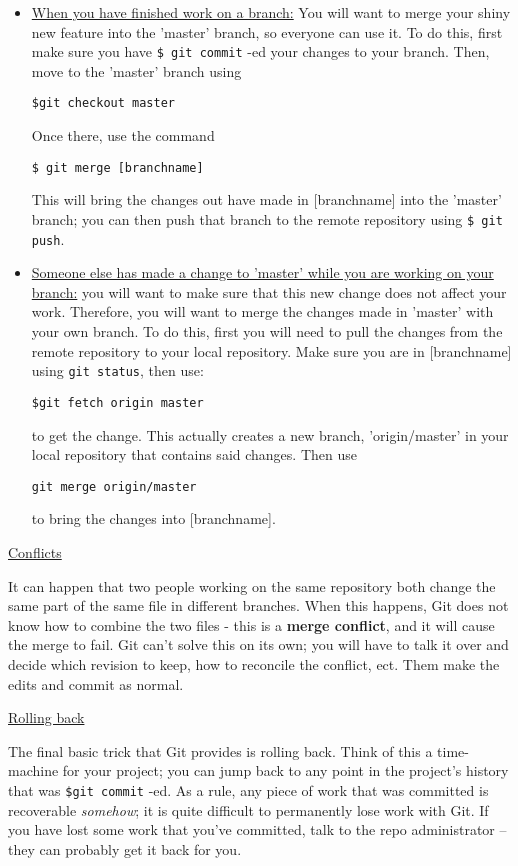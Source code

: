 \documentclass[11pt, a4paper, english]{article}
\begin{document}
\begin{itemize}
\item \underline{When you have finished work on a branch:} You will want to merge your shiny new feature into the 'master' branch, so everyone can use it. To do this, first make sure you have \verb|$ git commit| -ed your changes to your branch. Then, move to the 'master' branch using
\begin{verbatim}
$git checkout master
\end{verbatim}
Once there, use the command
\begin{verbatim}
$ git merge [branchname]
\end{verbatim}

This will bring the changes out have made in [branchname] into the 'master' branch; you can then push that branch to the remote repository using \verb|$ git push|.

\item \underline{Someone else has made a change to 'master' while you are working on your branch:} you will want to make sure that this new change does not affect your work. Therefore, you will want to merge the changes made in 'master' with your own branch.
To do this, first you will need to pull the changes from the remote repository to your local repository. Make sure you are in [branchname] using \verb|git status|, then use:
\begin{verbatim}
$git fetch origin master
\end{verbatim}
to get the change. This actually creates a new branch, 'origin/master' in your local repository that contains said changes. Then use
\begin{verbatim}
git merge origin/master
\end{verbatim}
to bring the changes into [branchname].
\end{itemize}

\underline{Conflicts}

It can happen that two people working on the same repository both change the same part of the same file in different branches. When this happens, Git does not know how to combine the two files - this is a \textbf{merge conflict}, and it will cause the merge to fail. Git can't solve this on its own; you will have to talk it over and decide which revision to keep, how to reconcile the conflict, ect. Them make the edits and commit as normal.

\underline{Rolling back}

The final basic trick that Git provides is rolling back. Think of this a time-machine for your project; you can jump back to any point in the project's history that was \verb|$git commit| -ed. As a rule, any piece of work that was committed is recoverable \textit{somehow}; it is quite difficult to permanently lose work with Git. If you have lost some work that you've committed, talk to the repo administrator -- they can probably get it back for you.
\end{document}
